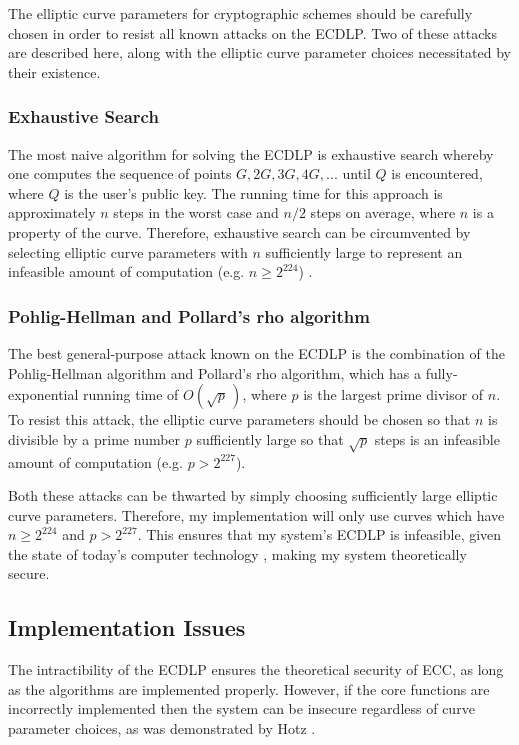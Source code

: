 \documentclass[12pt,a4paper]{article}
\begin{document}
The elliptic curve parameters for cryptographic schemes should be carefully chosen in order to resist all known attacks on the ECDLP. 
Two of these attacks are described here, along with the elliptic curve parameter choices necessitated by their existence. 

\subsubsection{Exhaustive Search} \noindent \label{Exhaustive Search}
The most naive algorithm for solving the ECDLP is exhaustive search whereby one computes the sequence of points 
$G,2G,3G,4G,...$ until $Q$ is encountered, where $Q$ is the user's public key. 
The running time for this approach is approximately $n$ steps in the worst case and $n/2$ steps on average, 
where $n$ is a property of the curve. 
Therefore, exhaustive search can be circumvented by selecting elliptic curve parameters with $n$ sufficiently 
large to represent an infeasible amount of computation (e.g. $n \geq 2^{224}$) \cite{hankerson2003guide}. 

\subsubsection{Pohlig-Hellman and Pollard's rho algorithm} \noindent \label{Pohlig-Hellman and Pollard's rho algorithm}
The best general-purpose attack known on the ECDLP is the combination of the Pohlig-Hellman algorithm and Pollard's rho algorithm, 
which has a fully-exponential running time of $O( \sqrt p \,)$, where $p$ is the largest prime divisor of $n$. 
To resist this attack, the elliptic curve parameters should be chosen so that $n$ is divisible by a prime number $p$ sufficiently large 
so that $\sqrt p$ steps is an infeasible amount of computation (e.g. $p > 2^{227}$). 

\vspace{1mm}

Both these attacks can be thwarted by simply choosing sufficiently large elliptic curve parameters. 
Therefore, my implementation will only use curves which have $n \geq 2^{224}$ and $p > 2^{227}$. 
This ensures that my system's ECDLP is infeasible, given the state of today's computer technology \cite{hankerson2003guide}, 
making my system theoretically secure. 

\subsection{Implementation Issues} \noindent
The intractibility of the ECDLP ensures the theoretical security of ECC, 
as long as the algorithms are implemented properly. 
However, if the core functions are incorrectly implemented then the system can be insecure regardless of curve parameter choices, 
as was demonstrated by Hotz \citeyear{hotz2010console}. 
\end{document}
